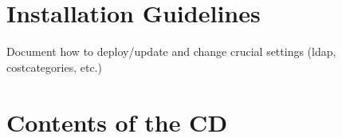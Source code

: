 \appendix

\chapter{Installation Guidelines}

Document how to deploy/update and change crucial settings (ldap, costcategories, etc.)

\chapter{Contents of the CD}
